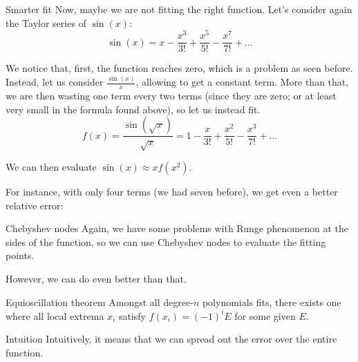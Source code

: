 \documentclass[a4paper]{article}
\begin{document}
\begin{parag}{Smarter fit}
    Now, maybe we are not fitting the right function. Let's consider again the Taylor series of $\sin\left(x\right)$:
    \[\sin\left(x\right) = x - \frac{x^3}{3!} + \frac{x^5}{5!} - \frac{x^7}{7!} + \ldots\]

    We notice that, first, the function reaches zero, which is a problem as seen before. Instead, let us consider $\frac{\sin\left(x\right)}{x}$, allowing to get a constant term. More than that, we are then wasting one term every two terms (since they are zero; or at least very small in the formula found above), so let us instead fit. 
    \[f\left(x\right) = \frac{\sin\left(\sqrt{x}\right)}{\sqrt{x}} = 1 - \frac{x}{3!} + \frac{x^2}{5!} - \frac{x^3}{7!} + \ldots\]
    
    We can then evaluate $\sin\left(x\right) \approx xf\left(x^2\right)$. 

    For instance, with only four terms (we had seven before), we get even a better relative error:
\end{parag}

\begin{parag}{Chebyshev nodes}
    Again, we have some problems with Runge phenomenon at the sides of the function, so we can use Chebyshev nodes to evaluate the fitting points.

    However, we can do even better than that.
\end{parag}

\begin{parag}{Equioscillation theorem}
    Amongst all degree-$n$ polynomials fits, there exists one where all local extrema $x_i$ satisfy $f\left(x_i\right) = \left(-1\right)^i E$ for some given $E$.

    \begin{subparag}{Intuition}
        Intuitively, it means that we can spread out the error over the entire function.
    \end{subparag}
\end{parag}
\end{document}
